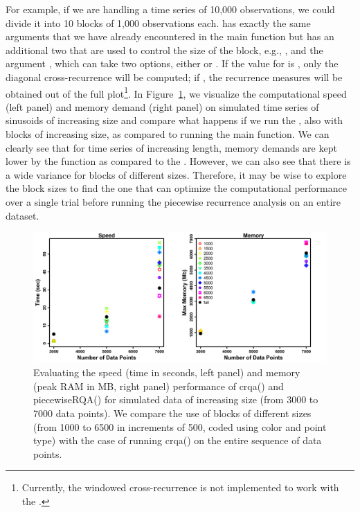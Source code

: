 For example, if we are handling a time series of 10,000 observations, we could divide it into 10 blocks of 1,000 observations each.  has exactly the same arguments that we have already encountered in the main  function but has an additional two that are used to control the size of the block, e.g., , and the argument , which can take two options, either  or . If the value for  is , only the diagonal cross-recurrence will be computed; if , the recurrence measures will be obtained out of the full plot\footnote{Currently, the windowed cross-recurrence is not implemented to work with the .}. In Figure~\ref{fig:performance}, we visualize the computational speed (left panel) and memory demand (right panel) on simulated time series of sinusoids of increasing size and compare what happens if we run the , also with blocks of increasing size, as compared to running the main  function. We can clearly see that for time series of increasing length, memory demands are kept lower by the  function as compared to the . However, we can also see that there is a wide variance for blocks of different sizes. Therefore, it may be wise to explore the block sizes to find the one that can optimize the computational performance over a single trial before running the piecewise recurrence analysis on an entire dataset.

\begin{figure}
\includegraphics[width=\columnwidth]{Figure6_complete.png}
\caption{\label{fig:performance} Evaluating the speed (time in seconds, left panel) and memory (peak RAM in MB, right panel) performance of crqa() and piecewiseRQA() for simulated data of increasing size (from 3000 to 7000 data points). We compare the use of blocks of different sizes (from 1000 to 6500 in increments of 500, coded using color and point type) with the case of running crqa() on the entire sequence of data points.}
\end{figure}

